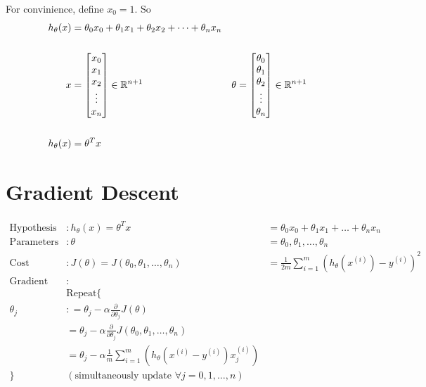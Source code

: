 For convinience, define $x_0 = 1$. So
\begin{align*}
    h_\theta(x) & = \theta_0x_0	+ \theta_1x_1 + \theta_2x_2 + \dots + \theta_nx_n   \\
    \\
    x           & = \begin{bmatrix}
        x_0    \\
        x_1    \\
        x_2    \\
        \vdots \\
        x_n    \\
    \end{bmatrix} \in \mathbb{R}^{n+1}                       &
    \theta      & = \begin{bmatrix}
        \theta_0 \\
        \theta_1 \\
        \theta_2 \\
        \vdots   \\
        \theta_n \\
    \end{bmatrix} \in \mathbb{R}^{n+1}                         \\
    \\
    h_\theta(x) & = \theta^Tx                                                      \\
\end{align*}

\section{Gradient Descent}

\begin{align*}
    \text{Hypothesis}       & :  h_\theta(x) = \theta^Tx
                            & = \theta_0x_0 + \theta_1x_1 + \dots + \theta_nx_n              \\
    \text{Parameters}       & : \theta
                            & =\theta_0, \theta_1, \dots, \theta_n                           \\
    \text{Cost Function}    & : J(\theta) = J(\theta_0, \theta_1, \dots, \theta_n)
                            & =\frac{1}{2m}\sum_{i=1}^m(h_\theta(x^{(i)}) - y^{(i)})^2       \\
    \text{Gradient Descent} & :                                                              \\
                            & \text{Repeat} \{                                               \\
    \theta_j                & : =
    \theta_j - \alpha\frac{\partial}{\partial\theta_j}J(\theta)                              \\
                            & =
    \theta_j - \alpha\frac{\partial}{\partial\theta_j}J(\theta_0, \theta_1, \dots, \theta_n) \\
                            & =
    \theta_j - \alpha\frac{1}{m}\sum_{i=1}^m(h_\theta(x^{(i)} - y^{(i)})x_j^{(i)})           \\
    \}                      & (\text{simultaneously update }
    \forall j = 0, 1, \dots, n)
\end{align*}

